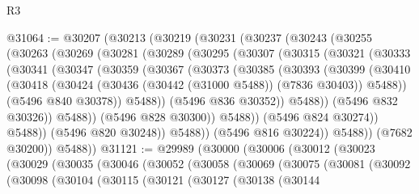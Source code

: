 \begin{lexlean}{R3}
\begin{coremodule}
@31064 := @30207
    (@30213
      (@30219
        (@30231
          (@30237
            (@30243
              (@30255
                (@30263
                  (@30269
                    (@30281
                      (@30289
                        (@30295
                          (@30307
                            (@30315
                              (@30321
                                (@30333
                                  (@30341
                                    (@30347
                                      (@30359
                                        (@30367
                                          (@30373
                                            (@30385
                                              (@30393
                                                (@30399
                                                  (@30410
                                                    (@30418
                                                      (@30424
                                                        (@30436
                                                          (@30442 (@31000 @5488))
                                                          (@7836 @30403))
                                                        @5488))
                                                    (@5496 @840 @30378))
                                                  @5488))
                                              (@5496 @836 @30352))
                                            @5488))
                                        (@5496 @832 @30326))
                                      @5488))
                                  (@5496 @828 @30300))
                                @5488))
                            (@5496 @824 @30274))
                          @5488))
                      (@5496 @820 @30248))
                    @5488))
                (@5496 @816 @30224))
              @5488))
          (@7682 @30200))
        @5488))
@31121 := @29989
    (@30000
      (@30006
        (@30012
          (@30023
            (@30029
              (@30035
                (@30046
                  (@30052
                    (@30058
                      (@30069
                        (@30075
                          (@30081
                            (@30092
                              (@30098
                                (@30104
                                  (@30115
                                    (@30121
                                      (@30127
                                        (@30138
                                          (@30144

\end{coremodule}
\end{lexlean}
